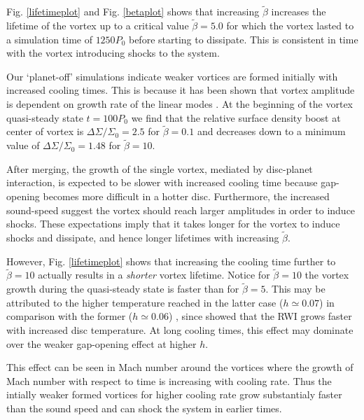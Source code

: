 Fig. \ref{lifetimeplot} and Fig. \ref{betaplot} shows that increasing 
$\tilde{\beta}$
increases the lifetime of the vortex up to a critical 
value $\tilde{\beta}=5.0$ for which the vortex lasted to a simulation time of
 $1250P_0$ before starting to dissipate. This is consistent in time with the
 vortex introducing shocks to the system.

Our `planet-off' simulations
indicate weaker vortices are formed initially with increased cooling
times. This is because it has been shown that vortex amplitude is dependent on 
growth rate of the linear modes \citep{meheut2013}.
At the beginning of the vortex quasi-steady state $t=100P_0$ we find
that the relative surface density boost at center of vortex 
is $\Delta\Sigma/\Sigma_0=2.5$ for $\tilde\beta=0.1$ 
and decreases down to a minimum value of $\Delta\Sigma/\Sigma_0=1.48$ for 
$\tilde\beta=10$. 

 After merging, the growth of the single vortex, mediated by disc-planet
interaction, is expected to be slower with increased cooling time
because gap-opening becomes more difficult in a hotter
disc. Furthermore, the increased sound-speed suggest the vortex should
reach larger amplitudes in order to induce shocks. 
These expectations
imply that it takes longer for the vortex to induce shocks and
dissipate, and hence longer lifetimes with increasing
$\tilde{\beta}$. 

However, Fig. \ref{lifetimeplot} shows that increasing the cooling
time further to $\tilde{\beta}=10$ actually results in a
\emph{shorter} vortex lifetime. Notice for $\tilde{\beta}=10$ the vortex growth 
during the quasi-steady state is faster than for
$\tilde{\beta}=5$.
 This may be attributed to the higher temperature
reached in the latter case ($h\simeq 0.07$) in comparison with the former
($h\simeq 0.06$)
, since \cite{li00} showed that the RWI grows
faster with increased disc temperature. At long cooling times, this
effect may dominate over the weaker gap-opening effect at higher $h$.   

This effect can be seen in Mach number around the vortices where the
growth of Mach number with respect to time is increasing with cooling rate.
Thus the intially weaker formed vortices for higher cooling rate grow
substantialy faster than the sound speed and can shock the system in earlier
times.

